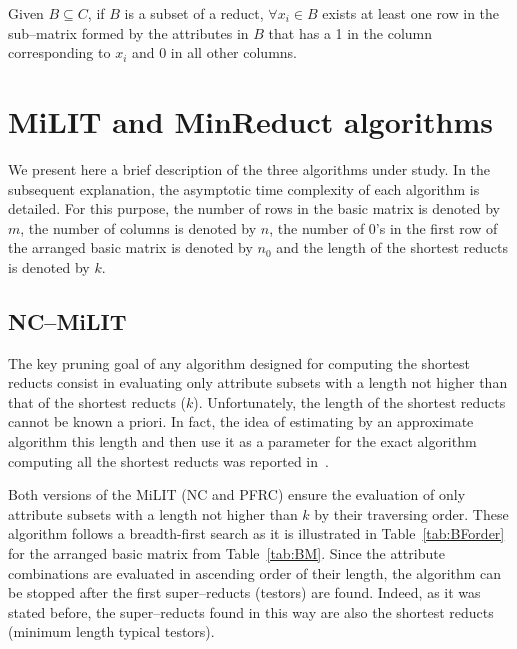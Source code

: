 \documentclass[citenumber]{llncs}
\begin{document}
	\begin{proposition}\label{prop:exclusion} 
		Given $B \subseteq C$, if $B$ is a subset of a reduct, $\forall x_i \in B$ exists at least one row in the sub--matrix formed by the attributes in $B$ that has a 1 in the column corresponding to $x_i$ and 0 in all other columns.
	\end{proposition}
	
%
\section{MiLIT and MinReduct algorithms} \label{Algs}
%
	We present here a brief description of the three algorithms under study. In the subsequent explanation, the asymptotic time complexity of each algorithm is detailed. For this purpose, the number of rows in the basic matrix is denoted by $m$, the number of columns is denoted by $n$, the number of 0's in the first row of the arranged basic matrix is denoted by $n_0$ and the length of the shortest reducts is denoted by $k$.
%	
\subsection{NC--MiLIT}	
%
	The key pruning goal of any algorithm designed for computing the shortest reducts consist in evaluating only attribute subsets with a length not higher than that of the shortest reducts ($k$). Unfortunately, the length of the shortest reducts cannot be known a priori. In fact, the idea of estimating by an approximate algorithm this length and then use it as a parameter for the exact algorithm computing all the shortest reducts was reported in~\cite{Lin04}.
	
	Both versions of the MiLIT (NC and PFRC) ensure the evaluation of only attribute subsets with a length not higher than $k$ by their traversing order. These algorithm follows a breadth-first search as it is illustrated in Table~\ref{tab:BForder} for the arranged basic matrix from Table~\ref{tab:BM}. Since the attribute combinations are evaluated in ascending order of their length, the algorithm can be stopped after the first super--reducts (testors) are found. Indeed, as it was stated before, the super--reducts found in this way are also the shortest reducts (minimum length typical testors).
\end{document}
